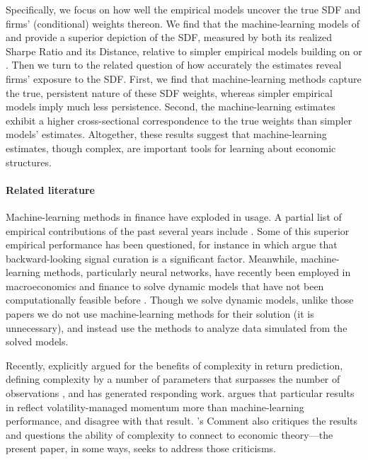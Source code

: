 \documentclass[12pt]{scrarticle}
\begin{document}
Specifically, we focus on how well the empirical models uncover the true SDF and firms' (conditional) weights thereon. We find that the machine-learning models of \citet{kps} and \citet{dkkm} provide a superior depiction of the SDF, measured by both its realized Sharpe Ratio and its \citet{hj} Distance, relative to simpler empirical models building on \citet{fama-french-2015} or \citet{fama_french_2019}. Then we turn to the related question of how accurately the estimates reveal firms' exposure to the SDF. First, we find that machine-learning methods capture the true, persistent nature of these SDF weights, whereas simpler empirical models imply much less persistence. Second, the machine-learning estimates exhibit a higher cross-sectional correspondence to the true weights than simpler models' estimates. Altogether, these results suggest that machine-learning estimates, though complex, are important tools for learning about economic structures.



\paragraph{Related literature} Machine-learning methods in finance have exploded in usage. A partial list of empirical contributions of the past several years include \citet{gu2020empirical,kozak2020shrinking,lettau2020factors,freyberger2020dissecting,bianchi2021bond,bali2023option}. Some of this superior empirical performance has been questioned, for instance in \citet{li2025mluniverse} which argue that backward-looking signal curation is a significant factor. Meanwhile, machine-learning methods, particularly neural networks, have recently been employed in macroeconomics and finance to solve dynamic models that have not been computationally feasible before \citep[e.g.][]{barnett_brock_hansen_hu_huang_2023_dla,duarte2024machine}. Though we solve dynamic models, unlike those papers we do not use machine-learning methods for their solution (it is unnecessary), and instead use the methods to analyze data simulated from the solved models. 

Recently, \citet{kelly_malamud_zhou_2024} explicitly argued for the benefits of complexity in return prediction, defining complexity by a number of parameters that surpasses the number of observations \citep[further elaboration on this idea is found in][]{kelly_malamud_2025}, and has generated responding work. \citet{nagel2025complexity} argues that particular results in \citet{kelly_malamud_zhou_2024} reflect volatility-managed momentum more than machine-learning performance, and \citet{kelly_malamud_2025} disagree with that result. \citet{berk2023}'s Comment also critiques the \citet{kelly_malamud_zhou_2024} results and questions the ability of complexity to connect to economic theory---the present paper, in some ways, seeks to address those criticisms.
\end{document}
